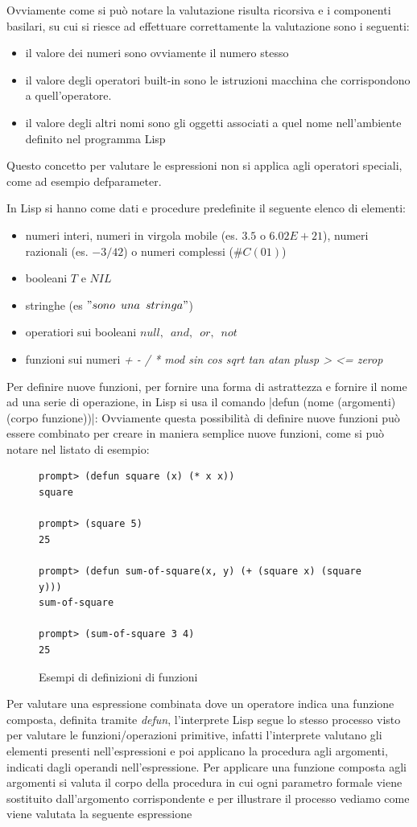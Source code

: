 \documentclass[a4paper]{book}
\begin{document}
Ovviamente come si può notare la valutazione risulta ricorsiva e i componenti basilari, su cui si riesce ad effettuare correttamente la valutazione
sono i seguenti:
\begin{itemize}
\item il valore dei numeri sono ovviamente il numero stesso
\item il valore degli operatori built-in sono le istruzioni macchina che corrispondono a quell'operatore.
\item il valore degli altri nomi sono gli oggetti associati a quel nome nell'ambiente definito nel programma Lisp
\end{itemize}
Questo concetto per valutare le espressioni non si applica agli operatori speciali, come ad esempio defparameter.

In Lisp si hanno come dati e procedure predefinite il seguente elenco di elementi:
\begin{itemize}
\item numeri interi, numeri in virgola mobile (es. $3.5$ o $6.02E+21$), numeri razionali (es. $-3/42$) o numeri complessi ($\#C (0 1)$)
\item booleani $T$ e $NIL$
\item stringhe (es $"sono\,\,\, una \,\,\,stringa"$)
\item operatiori sui booleani $null,\,\,\,and,\,\,\, or,\,\,\,not$
\item funzioni sui numeri \textit{+ - / * mod sin cos sqrt tan atan plusp > <= zerop}
\end{itemize}
Per definire nuove funzioni, per fornire una forma di astrattezza e fornire il nome ad una serie di operazione, in Lisp si usa il comando
|defun (nome (argomenti) (corpo funzione))|:
Ovviamente questa possibilità di definire nuove funzioni può essere combinato per creare in maniera semplice nuove funzioni, come si può
notare nel listato di esempio:
\begin{figure}
\caption{Esempi di definizioni di funzioni}
\begin{verbatim}
prompt> (defun square (x) (* x x))
square

prompt> (square 5)
25 

prompt> (defun sum-of-square(x, y) (+ (square x) (square y)))
sum-of-square

prompt> (sum-of-square 3 4)
25
\end{verbatim}
\end{figure}
Per valutare una espressione combinata dove un operatore indica una funzione composta, definita tramite \emph{defun}, l'interprete Lisp segue
lo stesso processo visto per valutare le funzioni/operazioni primitive, infatti l'interprete valutano gli elementi presenti nell'espressioni
e poi applicano la procedura agli argomenti, indicati dagli operandi nell'espressione.\newline
Per applicare una funzione composta agli argomenti si valuta il corpo della procedura in cui ogni parametro formale
viene sostituito dall'argomento corrispondente e per illustrare il processo vediamo come viene valutata la seguente espressione
\end{document}
